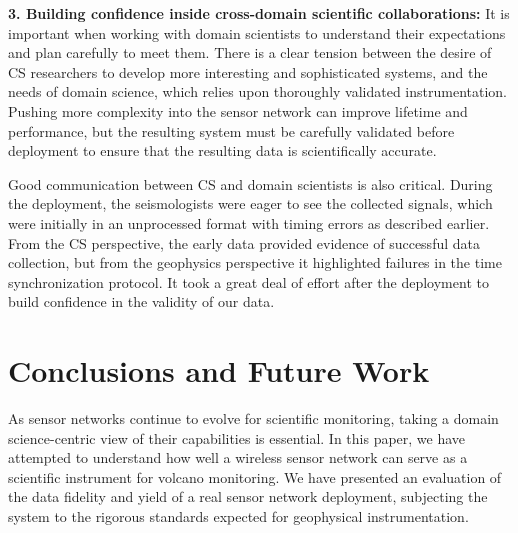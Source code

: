 {\bf 3. Building confidence inside cross-domain scientific collaborations:}
It is important when working with domain scientists to understand their
expectations and plan carefully to meet them. There is a clear tension
between the desire of CS researchers to develop more interesting and
sophisticated systems, and the needs of domain science, which relies
upon thoroughly validated instrumentation. Pushing more
complexity into the sensor network can improve lifetime and
performance, but the resulting system must be carefully validated
before deployment to ensure that the resulting data is scientifically
accurate.

Good communication between CS and domain scientists is also critical.
During the deployment, the seismologists were eager to see the
collected signals, which were initially in an unprocessed format with
timing errors as described earlier. From the CS perspective, the
early data provided evidence of successful data collection, but from
the geophysics perspective it highlighted failures in the time
synchronization protocol. It took a great deal of effort after 
the deployment to build confidence in the validity of our data.


\section{Conclusions and Future Work}
\label{sec-conclusions}
\label{sec-future}
\label{sec-futurework}

As sensor networks continue to evolve for scientific monitoring,
taking a domain science-centric view of their capabilities is essential.
In this
paper, we have attempted to understand how well a wireless sensor
network can serve as a scientific instrument for volcano monitoring. 
We have presented an evaluation of the data fidelity and yield of a real sensor 
network deployment, subjecting the system to the rigorous standards 
expected for geophysical instrumentation.

